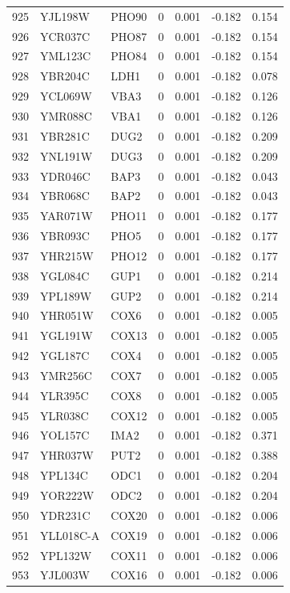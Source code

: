\begin{longtable}{rllrrrr}
925 & YJL198W & PHO90 & 0 & 0.001 & -0.182 & 0.154\\
926 & YCR037C & PHO87 & 0 & 0.001 & -0.182 & 0.154\\
927 & YML123C & PHO84 & 0 & 0.001 & -0.182 & 0.154\\
928 & YBR204C & LDH1 & 0 & 0.001 & -0.182 & 0.078\\
929 & YCL069W & VBA3 & 0 & 0.001 & -0.182 & 0.126\\
930 & YMR088C & VBA1 & 0 & 0.001 & -0.182 & 0.126\\
931 & YBR281C & DUG2 & 0 & 0.001 & -0.182 & 0.209\\
932 & YNL191W & DUG3 & 0 & 0.001 & -0.182 & 0.209\\
933 & YDR046C & BAP3 & 0 & 0.001 & -0.182 & 0.043\\
934 & YBR068C & BAP2 & 0 & 0.001 & -0.182 & 0.043\\
935 & YAR071W & PHO11 & 0 & 0.001 & -0.182 & 0.177\\
936 & YBR093C & PHO5 & 0 & 0.001 & -0.182 & 0.177\\
937 & YHR215W & PHO12 & 0 & 0.001 & -0.182 & 0.177\\
938 & YGL084C & GUP1 & 0 & 0.001 & -0.182 & 0.214\\
939 & YPL189W & GUP2 & 0 & 0.001 & -0.182 & 0.214\\
940 & YHR051W & COX6 & 0 & 0.001 & -0.182 & 0.005\\
941 & YGL191W & COX13 & 0 & 0.001 & -0.182 & 0.005\\
942 & YGL187C & COX4 & 0 & 0.001 & -0.182 & 0.005\\
943 & YMR256C & COX7 & 0 & 0.001 & -0.182 & 0.005\\
944 & YLR395C & COX8 & 0 & 0.001 & -0.182 & 0.005\\
945 & YLR038C & COX12 & 0 & 0.001 & -0.182 & 0.005\\
946 & YOL157C & IMA2 & 0 & 0.001 & -0.182 & 0.371\\
947 & YHR037W & PUT2 & 0 & 0.001 & -0.182 & 0.388\\
948 & YPL134C & ODC1 & 0 & 0.001 & -0.182 & 0.204\\
949 & YOR222W & ODC2 & 0 & 0.001 & -0.182 & 0.204\\
950 & YDR231C & COX20 & 0 & 0.001 & -0.182 & 0.006\\
951 & YLL018C-A & COX19 & 0 & 0.001 & -0.182 & 0.006\\
952 & YPL132W & COX11 & 0 & 0.001 & -0.182 & 0.006\\
953 & YJL003W & COX16 & 0 & 0.001 & -0.182 & 0.006\\

\end{longtable}
